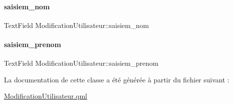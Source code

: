 \paragraph{\texorpdfstring{saisiem\+\_\+nom}{saisiem\_nom}}
{\footnotesize\ttfamily Text\+Field Modification\+Utilisateur\+::saisiem\+\_\+nom\hspace{0.3cm}{\ttfamily [private]}}

\mbox{\label{class_modification_utilisateur_ae5fd8aa697fddc1b7c5a319d9ac78dfb}} 
\paragraph{\texorpdfstring{saisiem\+\_\+prenom}{saisiem\_prenom}}
{\footnotesize\ttfamily Text\+Field Modification\+Utilisateur\+::saisiem\+\_\+prenom\hspace{0.3cm}{\ttfamily [private]}}



La documentation de cette classe a été générée à partir du fichier suivant \+:\begin{DoxyCompactItemize}
\item 
\hyperlink{_modification_utilisateur_8qml}{Modification\+Utilisateur.\+qml}\end{DoxyCompactItemize}

